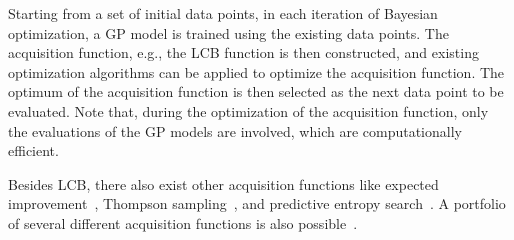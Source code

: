 Starting from a set of initial data points, in each iteration of Bayesian
optimization, a GP model is trained using the existing data points. The
acquisition function, e.g., the LCB function is then constructed, and existing
optimization algorithms can be applied to optimize the acquisition function.
The optimum of the acquisition function is then selected as the next data point
to be evaluated. Note that, during the optimization of the acquisition
function, only the evaluations of the GP models are involved, which are
computationally efficient. 

Besides LCB, there also exist other acquisition functions like expected
improvement~\cite{bull2011convergence}, Thompson
sampling~\cite{chapelle2011empirical}, and predictive entropy
search~\cite{hernandez2014predictive}. A portfolio of several different
acquisition functions is also possible~\cite{hoffman2011portfolio}.
